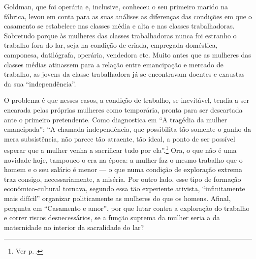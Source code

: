 Goldman, que foi operária e, inclusive, conheceu o seu primeiro
marido na fábrica, levou em conta para as 
suas análises as diferenças das condições em que o casamento se
estabelece nas classes média e alta e nas classes
trabalhadoras. Sobretudo porque às mulheres das classes
trabalhadoras nunca foi estranho o trabalho fora do lar, seja na
condição de criada, empregada doméstica, camponesa, datilógrafa,
operária, vendedora etc. Muito antes que as mulheres das classes médias
atinassem para a relação entre emancipação e mercado de trabalho, as
jovens da classe trabalhadora já se encontravam doentes e exaustas da
sua ``independência''. 

O problema é que nesses casos, a condição de
trabalho, se inevitável, tendia a ser encarada pelas próprias mulheres
como temporária, pronta para ser descartada ante o primeiro pretendente.
Como diagnostica em ``A tragédia da mulher emancipada'': ``A
chamada independência, que possibilita tão somente o ganho da mera
subsistência, não parece tão atraente, tão ideal, a ponto de ser possível
esperar que a mulher venha a sacrificar tudo por ela''.\footnote{Ver p.\,\pageref{ganho}.} Ora, o que não é
uma novidade hoje, tampouco o era na época: a mulher faz o mesmo
trabalho que o homem e o seu salário é menor --- o que numa condição de
exploração extrema traz consigo, necessariamente, a miséria. Por outro
lado, esse tipo de formação econômico-cultural tornava, segundo essa tão
experiente ativista, ``infinitamente mais difícil'' organizar
politicamente as mulheres do que os homens. Afinal, pergunta em
``Casamento e amor'', por que lutar contra a exploração do trabalho e
correr riscos desnecessários, se a função suprema da mulher seria a da
maternidade no interior da sacralidade do lar?

